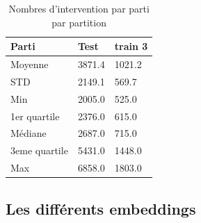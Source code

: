 \begin{table}[ht]
    \centering
\begin{tabular}{|l|l|l|}
\hline
Parti & Test & train 3 \\ \hline
Moyenne & 3871.4 & 1021.2 \\ \hline
STD & 2149.1 & 569.7 \\ \hline
Min & 2005.0 & 525.0 \\ \hline
1er quartile & 2376.0 & 615.0 \\ \hline
Médiane & 2687.0 & 715.0\\ \hline
3eme quartile & 5431.0 & 1448.0\\ \hline
Max & 6858.0 & 1803.0\\ \hline
\end{tabular}
\caption{Nombres d'intervention par parti par partition}
\label{tab:stats_dataset}
\end{table}


\subsection{Les différents embeddings}